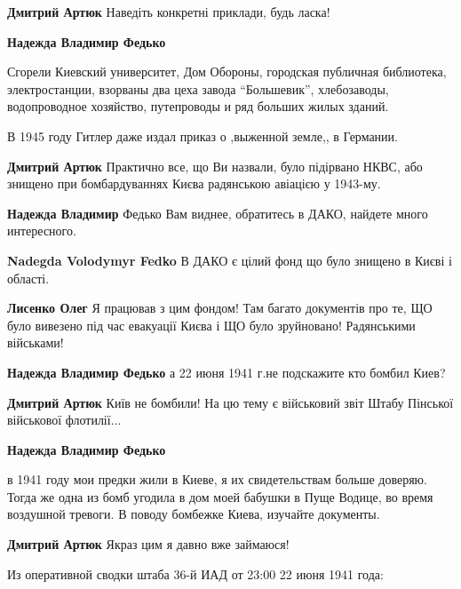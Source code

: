 \begin{itemize}
\begin{itemize}
\begin{itemize} %
\textbf{Дмитрий Артюк} Наведіть конкретні приклади, будь ласка!

\textbf{Надежда Владимир Федько}

Сгорели Киевский университет, Дом Обороны, городская публичная библиотека,
электростанции, взорваны два цеха завода \enquote{Большевик}, хлебозаводы,
водопроводное хозяйство, путепроводы и ряд больших жилых зданий.

В 1945 году Гитлер даже издал приказ о ,выженной земле,, в Германии.

\textbf{Дмитрий Артюк} Практично все, що Ви назвали, було підірвано НКВС, або знищено при бомбардуваннях Києва радянською авіацією у 1943-му.

\textbf{Надежда Владимир} Федько Вам виднее, обратитесь в ДАКО, найдете много интересного.
\end{itemize} %

\textbf{Nadegda Volodymyr Fedko} В ДАКО є цілий фонд що було знищено в Києві і області.

\textbf{Лисенко Олег} Я працював з цим фондом! Там багато документів про те, ЩО було вивезено під час евакуації Києва і ЩО було зруйновано!
Радянськими військами!

\textbf{Надежда Владимир Федько} а 22 июня 1941 г.не подскажите кто бомбил Киев?

\begin{itemize} %
\textbf{Дмитрий Артюк} Київ не бомбили! На цю тему є військовий звіт Штабу Пінської військової флотилії...

\textbf{Надежда Владимир Федько} 

в 1941 году мои предки жили в Киеве, я их свидетельствам больше доверяю. Тогда же
одна из бомб угодила в дом моей бабушки в Пуще Водице, во время воздушной
тревоги. В поводу бомбежке Киева, изучайте документы.


\textbf{Дмитрий Артюк} Якраз цим я давно вже займаюся!

Из оперативной сводки штаба 36-й ИАД от 23:00 22 июня 1941 года:


\end{itemize}
\end{itemize}
\end{itemize}
